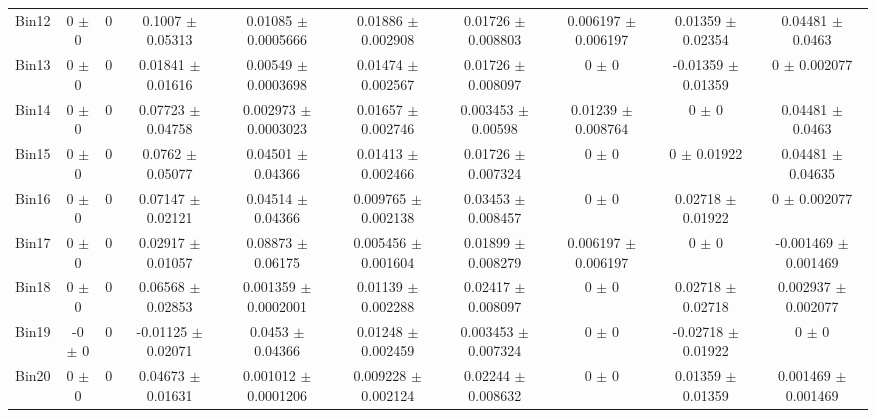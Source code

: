 \begin{tabular}{@{\extracolsep{4pt}}lccccccccc@{}}
     Bin12 & 0 $\pm$ 0 & 0 & 0.1007 $\pm$ 0.05313 & 0.01085 $\pm$ 0.0005666 & 0.01886 $\pm$ 0.002908 & 0.01726 $\pm$ 0.008803 & 0.006197 $\pm$ 0.006197 & 0.01359 $\pm$ 0.02354 & 0.04481 $\pm$ 0.0463 \\ 
     Bin13 & 0 $\pm$ 0 & 0 & 0.01841 $\pm$ 0.01616 & 0.00549 $\pm$ 0.0003698 & 0.01474 $\pm$ 0.002567 & 0.01726 $\pm$ 0.008097 & 0 $\pm$ 0 & -0.01359 $\pm$ 0.01359 & 0 $\pm$ 0.002077 \\ 
     Bin14 & 0 $\pm$ 0 & 0 & 0.07723 $\pm$ 0.04758 & 0.002973 $\pm$ 0.0003023 & 0.01657 $\pm$ 0.002746 & 0.003453 $\pm$ 0.00598 & 0.01239 $\pm$ 0.008764 & 0 $\pm$ 0 & 0.04481 $\pm$ 0.0463 \\ 
     Bin15 & 0 $\pm$ 0 & 0 & 0.0762 $\pm$ 0.05077 & 0.04501 $\pm$ 0.04366 & 0.01413 $\pm$ 0.002466 & 0.01726 $\pm$ 0.007324 & 0 $\pm$ 0 & 0 $\pm$ 0.01922 & 0.04481 $\pm$ 0.04635 \\ 
     Bin16 & 0 $\pm$ 0 & 0 & 0.07147 $\pm$ 0.02121 & 0.04514 $\pm$ 0.04366 & 0.009765 $\pm$ 0.002138 & 0.03453 $\pm$ 0.008457 & 0 $\pm$ 0 & 0.02718 $\pm$ 0.01922 & 0 $\pm$ 0.002077 \\ 
     Bin17 & 0 $\pm$ 0 & 0 & 0.02917 $\pm$ 0.01057 & 0.08873 $\pm$ 0.06175 & 0.005456 $\pm$ 0.001604 & 0.01899 $\pm$ 0.008279 & 0.006197 $\pm$ 0.006197 & 0 $\pm$ 0 & -0.001469 $\pm$ 0.001469 \\ 
     Bin18 & 0 $\pm$ 0 & 0 & 0.06568 $\pm$ 0.02853 & 0.001359 $\pm$ 0.0002001 & 0.01139 $\pm$ 0.002288 & 0.02417 $\pm$ 0.008097 & 0 $\pm$ 0 & 0.02718 $\pm$ 0.02718 & 0.002937 $\pm$ 0.002077 \\ 
     Bin19 & -0 $\pm$ 0 & 0 & -0.01125 $\pm$ 0.02071 & 0.0453 $\pm$ 0.04366 & 0.01248 $\pm$ 0.002459 & 0.003453 $\pm$ 0.007324 & 0 $\pm$ 0 & -0.02718 $\pm$ 0.01922 & 0 $\pm$ 0 \\ 
     Bin20 & 0 $\pm$ 0 & 0 & 0.04673 $\pm$ 0.01631 & 0.001012 $\pm$ 0.0001206 & 0.009228 $\pm$ 0.002124 & 0.02244 $\pm$ 0.008632 & 0 $\pm$ 0 & 0.01359 $\pm$ 0.01359 & 0.001469 $\pm$ 0.001469 \\ 
\hline\hline
  \end{tabular}
